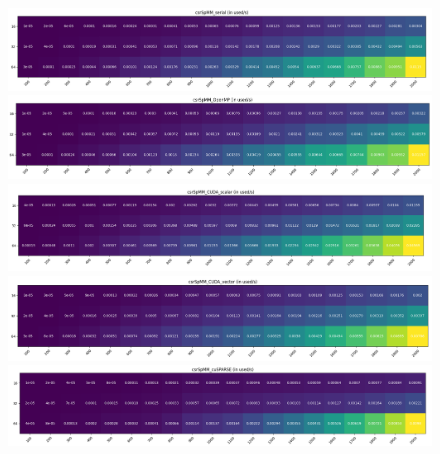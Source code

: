\documentclass[12pt]{ctexart}
\begin{document}
\begin{figure}
    \setlength{\leftskip}{-110pt}
    \includegraphics[scale=0.47]{6s}
    \includegraphics[scale=0.47]{7s}
    \includegraphics[scale=0.47]{8s}
    \includegraphics[scale=0.47]{9s}
    \includegraphics[scale=0.47]{10s}
\end{figure}
\end{document}
